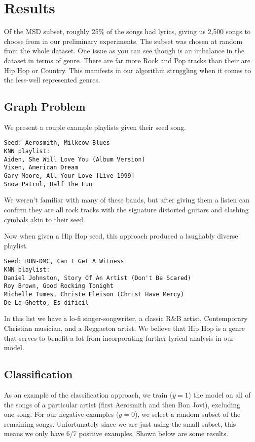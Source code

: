 \documentclass[10pt,journal,compsoc]{IEEEtran}
\begin{document}
\section{Results}
Of the MSD subset, roughly 25\% of the songs had lyrics, giving us 2,500 songs to choose from in our preliminary experiments. The subset was chosen at random from the whole dataset. One issue as you can see though is an imbalance in the dataset in terms of genre. There are far more Rock and Pop tracks than their are Hip Hop or Country. This manifests in our algorithm struggling when it comes to the less-well represented genres.

\subsection{Graph Problem}
We present a couple example playlists given their seed song.
\begin{lstlisting}
Seed: Aerosmith, Milkcow Blues
KNN playlist:
Aiden, She Will Love You (Album Version)
Vixen, American Dream
Gary Moore, All Your Love [Live 1999]
Snow Patrol, Half The Fun
\end{lstlisting}
We weren't familiar with many of these bands, but after giving them a listen can confirm they are all rock tracks with the signature distorted guitars and clashing cymbals akin to their seed.

Now when given a Hip Hop seed, this approach produced a laughably diverse playlist.
\begin{lstlisting}
Seed: RUN-DMC, Can I Get A Witness
KNN playlist:
Daniel Johnston, Story Of An Artist (Don't Be Scared)
Roy Brown, Good Rocking Tonight
Michelle Tumes, Christe Eleison (Christ Have Mercy)
De La Ghetto, Es dificil
\end{lstlisting}
In this list we have a lo-fi singer-songwriter, a classic R\&B artist, Contemporary Christian musician, and a Reggaeton artist. We believe that Hip Hop is a genre that serves to benefit a lot from incorporating further lyrical analysis in our model.

\subsection{Classification}
As an example of the classification approach, we train ($y=1$) the model on all of the songs of a particular artist (first Aerosmith and then Bon Jovi), excluding one song. For our negative examples ($y=0$), we select a random subset of the remaining songs. Unfortunately since we are just using the small subset, this means we only have 6/7 positive examples. Shown below are some results.
\end{document}
